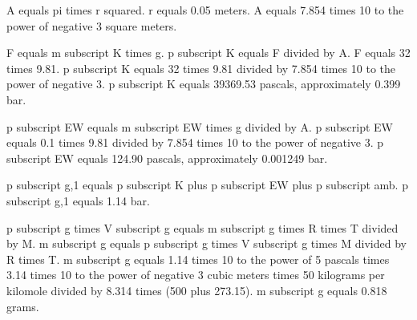 A equals pi times r squared.  
r equals 0.05 meters.  
A equals 7.854 times 10 to the power of negative 3 square meters.  

F equals m subscript K times g.  
p subscript K equals F divided by A.  
F equals 32 times 9.81.  
p subscript K equals 32 times 9.81 divided by 7.854 times 10 to the power of negative 3.  
p subscript K equals 39369.53 pascals, approximately 0.399 bar.  

p subscript EW equals m subscript EW times g divided by A.  
p subscript EW equals 0.1 times 9.81 divided by 7.854 times 10 to the power of negative 3.  
p subscript EW equals 124.90 pascals, approximately 0.001249 bar.  

p subscript g,1 equals p subscript K plus p subscript EW plus p subscript amb.  
p subscript g,1 equals 1.14 bar.  

p subscript g times V subscript g equals m subscript g times R times T divided by M.  
m subscript g equals p subscript g times V subscript g times M divided by R times T.  
m subscript g equals 1.14 times 10 to the power of 5 pascals times 3.14 times 10 to the power of negative 3 cubic meters times 50 kilograms per kilomole divided by 8.314 times (500 plus 273.15).  
m subscript g equals 0.818 grams.